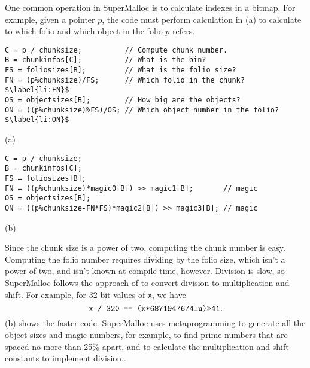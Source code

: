 \documentclass[natbib,sort&compress,10pt]{sigplanconf}
\newcommand{\code}[1]{\texttt{#1}}
\begin{document}

One common operation in SuperMalloc is to calculate indexes in a
bitmap.  For example, given a pointer $p$, the code must perform
calculation in (a) to calculate to which folio and
which object in the folio $p$ refers.

\begin{figure*}
\begin{verbatim}
C = p / chunksize;          // Compute chunk number.
B = chunkinfos[C];          // What is the bin?
FS = foliosizes[B];         // What is the folio size?
FN = (p%chunksize)/FS;      // Which folio in the chunk?$\label{li:FN}$
OS = objectsizes[B];        // How big are the objects?
ON = ((p%chunksize)%FS)/OS; // Which object number in the folio?$\label{li:ON}$
\end{verbatim}
\begin{center}
(a)
\end{center}
\begin{verbatim}
C = p / chunksize;
B = chunkinfos[C];
FS = foliosizes[B];
FN = ((p%chunksize)*magic0[B]) >> magic1[B];       // magic
OS = objectsizes[B];
ON = ((p%chunksize-FN*FS)*magic2[B]) >> magic3[B]; // magic
\end{verbatim}
\begin{center}
(b)
\end{center}
\caption{The calculation to compute the folio number in the chunk,
  \code{FN}, and the object number in the folio \code{ON}, so that the
  bitmap for the free objects in the folio can be updated.  (a) shows
  the code with expensive divisions in .  (b) shows
  the code with the divisions replaced by multiplication and shift.}
\label{fig:bitindex}
\end{figure*}


Since the chunk size is a power of two, computing the chunk number is
easy.  Computing the folio number requires dividing by the folio size,
which isn't a power of two, and isn't known at compile time, however.
Division is slow, so SuperMalloc follows the approach of
\cite{MagenheimerPePe87} to convert division to multiplication and
shift.  For example, for 32-bit values of \code{x}, we have
\[\mbox{\code{x / 320 == (x*6871947674lu)>>41}}.\]
(b) shows the faster code.  SuperMalloc uses
metaprogramming to generate all the object sizes and magic numbers,
for example, to find prime numbers that are spaced no more than 25\%
apart, and to calculate the multiplication and shift constants to
implement division..
\end{document}
